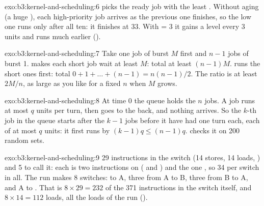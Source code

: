 \begin{solution}{exo:b3:kernel-and-scheduling:6}
 picks the ready job with the least . Without aging (a huge ), each high-priority job arrives as the previous one finishes, so the low one runs only after all ten: it finishes at 33. With  = 3 it gains a level every 3 units and runs much earlier ().
\end{solution}

\begin{solution}{exo:b3:kernel-and-scheduling:7}
Take one job of burst $M$ first and $n - 1$ jobs of burst 1.  makes each short job wait at least $M$: total at least $(n - 1)M$.  runs the short ones first: total $0 + 1 + \dots + (n - 1) = n(n - 1)/2$. The ratio is at least $2M/n$, as large as you like for a fixed $n$ when $M$ grows.
\end{solution}

\begin{solution}{exo:b3:kernel-and-scheduling:8}
At time 0 the queue holds the $n$ jobs. A job runs at most $q$ units per turn, then goes to the back, and nothing arrives. So the $k$-th job in the queue starts after the $k - 1$ jobs before it have had one turn each, each of at most $q$ units: it first runs by $(k - 1)q \le (n - 1)q$.  checks it on 200 random sets.
\end{solution}

\begin{solution}{exo:b3:kernel-and-scheduling:9}
29 instructions in the switch (14 stores, 14 loads, ) and 5 to call it: each  is two instructions on  ( and ) and the  one , so 34 per switch in all. The run makes 8 switches:  to A, three from A to B, three from B to A, and A to . That is $8 \times 29 = 232$ of the 371 instructions in the switch itself, and $8 \times 14 = 112$ loads, all the loads of the run ().
\end{solution}

